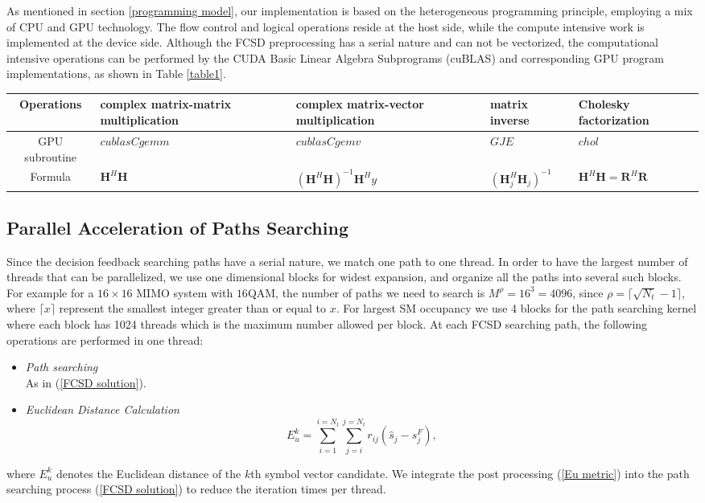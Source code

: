 \documentclass[letterpaper, 10pt, conference]{ieeeconf}
\begin{document}
As mentioned in section \ref{programming model}, our implementation is based on the heterogeneous programming principle, employing a mix of CPU and GPU technology. The flow control and logical operations reside at the host side, while the compute intensive work is implemented at the device side. Although the FCSD preprocessing has a serial nature and can not be vectorized, the computational intensive operations can be performed by the CUDA Basic Linear Algebra Subprograms (cuBLAS)\cite{nvidia2013basic} and corresponding GPU program implementations, as shown in Table \ref{table1}.
\begin{table*}[htb]
\centering
\caption{Parallel Computation Operation of FCSD Preprocessing}
\begin{tabular}{|c|p{3cm}|p{3cm}|p{3cm}|p{3cm}|}
\hline
Operations & complex matrix-matrix multiplication & complex matrix-vector multiplication & matrix inverse & Cholesky factorization \\
\hline
GPU subroutine & $\mathit{cublasCgemm}$  & $\mathit{cublasCgemv}$ & $\mathit{GJE}$ & $\mathit{chol}$\\
\hline
Formula   &  $\mathbf{H}^{H}\mathbf{H}$ & $(\mathbf{H}^{H}\mathbf{H})^{-1}\mathbf{H}^{H}y$ & $(\mathbf{H}_{j}^{H}\mathbf{H}_{j})^{-1} $ & $\mathbf{H}^{H}\mathbf{H}=\mathbf{R}^{H}\mathbf{R}$ 
\\
\hline
\end{tabular}
\label{table1}
\end{table*}

\subsection{Parallel Acceleration of Paths Searching}
Since the decision feedback searching paths have a serial nature, we match one path to one thread. In order to have the largest number of threads that can be parallelized, we use one dimensional blocks for widest expansion, and organize all the paths into several such blocks. For example for a $16\times 16$ MIMO system with $16$QAM, the number of paths we need to search is $M^{\rho}=16^{3}=4096$, since $\rho=\lceil \sqrt{N_{t}}-1\rceil$, where $\lceil x\rceil$ represent the smallest integer greater than or equal to $x$. For largest SM occupancy we use 4 blocks for the path searching kernel where each block has 1024 threads which is the maximum number allowed per block. At each FCSD searching path, the following operations are performed in one thread:
\begin{itemize}
\item \emph{Path searching}\\
As in (\ref{FCSD solution}).
\item \emph{Euclidean Distance Calculation}
\begin{equation}
E_{u}^{k}=\sum_{i=1}^{i=N_{t}}\sum_{j=i}^{j=N_{t}}r_{ij}(\hat{s}_{j}-s^{F}_{j}), \label{Eu metric}
\end{equation}
\end{itemize}
where $E_{u}^{k}$ denotes the Euclidean distance of the $k$th symbol vector candidate. We integrate the post processing (\ref{Eu metric}) into the path searching process (\ref{FCSD solution}) to reduce the iteration times per thread.
 
\end{document}
